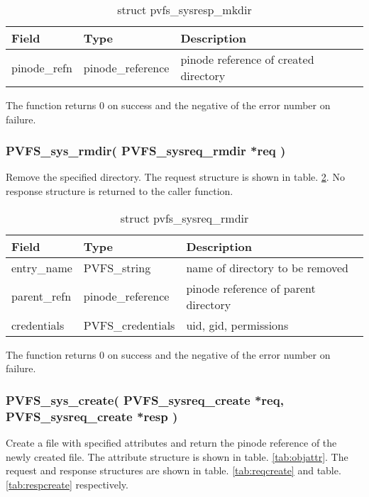\documentclass[11pt, letterpaper]{article}
\begin{document}
\begin{table}[H]
\begin{tabular}{|l|l|l|}
\hline
Field & Type & Description \\
\hline
\hline
pinode\_refn & pinode\_reference & pinode reference of created directory
\\
\hline
\end{tabular}
\caption{struct pvfs\_sysresp\_mkdir}\label{tab:respmkdir}
\end{table}

The function returns 0 on success and the negative of the error number
on failure.

\subsubsection{PVFS\_sys\_rmdir(
PVFS\_sysreq\_rmdir *req
)}

Remove the specified directory. The request structure is shown in table.
 \ref{tab:reqrmdir}. No response structure is returned to the caller
function.

\begin{table}[H]
\begin{tabular}{|l|l|l|}
\hline
Field & Type & Description \\
\hline
\hline
entry\_name & PVFS\_string &  name of directory to be removed \\
\hline
parent\_refn & pinode\_reference & pinode reference of parent directory \\ 
\hline
credentials & PVFS\_credentials & uid, gid, permissions \\
\hline
\end{tabular}
\caption{struct pvfs\_sysreq\_rmdir}\label{tab:reqrmdir}
\end{table}

The function returns 0 on success and the negative of the error
number on failure.

\subsubsection{PVFS\_sys\_create(
PVFS\_sysreq\_create *req,
PVFS\_sysreq\_create *resp
)}
		
Create a file with specified attributes and return the pinode
reference of the newly created file. The attribute structure is
shown in table. \ref{tab:objattr}. The request and response structures
are shown in table. \ref{tab:reqcreate} and table. \ref{tab:respcreate}
respectively.
\end{document}

